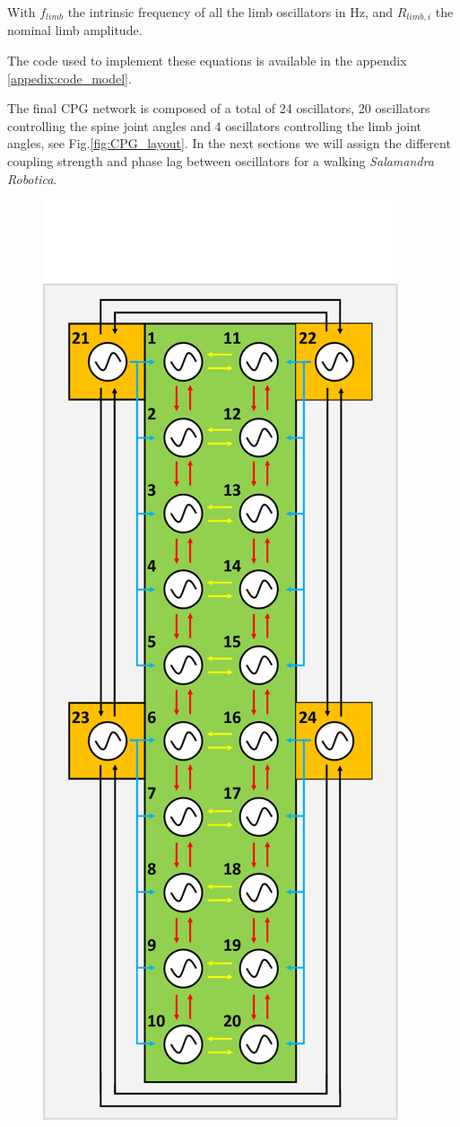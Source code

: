 \documentclass[a4paper]{scrartcl}
\begin{document}
{With $f_{limb}$ the intrinsic frequency of all the limb oscillators in Hz, and $R_{limb,i}$ the nominal limb amplitude.

The code used to implement these equations is available in the appendix \ref{appedix:code_model}.

The final CPG network is composed of a total of 24 oscillators, 20 oscillators controlling the spine joint angles and 4 oscillators controlling the limb joint angles, see Fig.\ref{fig:CPG_layout}. In the next sections we will assign the different coupling strength and phase lag between oscillators for a walking \textit{Salamandra Robotica}.

\begin{figure}
 \centering
 \includegraphics[width=\linewidth]{Figures/CPG_network_V.PNG}

\end{figure}}
\end{document}
